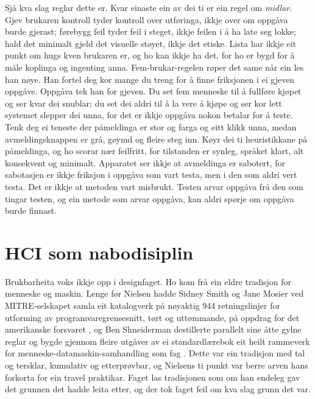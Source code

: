 Sjå kva slag reglar dette er. Kvar einaste ein av dei ti er ein regel om \emph{midlar}. Gjev brukaren kontroll tyder kontroll over utføringa, ikkje over om oppgåva burde gjerast; førebygg feil tyder feil i steget, ikkje feilen i å ha late seg lokke; hald det minimalt gjeld det visuelle støyet, ikkje det etiske. Lista har ikkje eit punkt om hugs kven brukaren er, og ho kan ikkje ha det, for ho er bygd for å måle koplinga og ingenting anna. Fem-brukar-regelen røper det same når ein les han nøye. Han fortel deg kor mange du treng for å finne friksjonen i ei gjeven oppgåve. Oppgåva tek han for gjeven. Du set fem menneske til å fullføre kjøpet og ser kvar dei snublar; du set dei aldri til å la vere å kjøpe og ser kor lett systemet slepper dei unna, for det er ikkje oppgåva nokon betalar for å teste. Tenk deg ei teneste der påmeldinga er stor og farga og eitt klikk unna, medan avmeldingsknappen er grå, gøymd og fleire steg inn. Køyr dei ti heuristikkane på påmeldinga, og ho scorar nær feilfritt, for tilstanden er synleg, språket klart, alt konsekvent og minimalt. Apparatet ser ikkje at avmeldinga er sabotert, for sabotasjen er ikkje friksjon i oppgåva som vart testa, men i den som aldri vert testa. Det er ikkje at metoden vart misbrukt. Testen arvar oppgåva frå den som tingar testen, og ein metode som arvar oppgåva, kan aldri spørje om oppgåva burde finnast.

\section{HCI som nabodisiplin}

Brukbarheita voks ikkje opp i designfaget. Ho kom frå ein eldre tradisjon for menneske og maskin. Lenge før Nielsen hadde Sidney Smith og Jane Mosier ved MITRE-selskapet samla eit katalogverk på nøyaktig 944 retningslinjer for utforming av programvaregrensesnitt, tørt og uttømmande, på oppdrag for det amerikanske forsvaret \autocite{smith1986guidelines}, og Ben Shneiderman destillerte parallelt sine åtte gylne reglar og bygde gjennom fleire utgåver av ei standardlærebok eit heilt rammeverk for menneske-datamaskin-samhandling som fag \autocite{shneiderman2016ui}. Dette var ein tradisjon med tal og tersklar, kumulativ og etterprøvbar, og Nielsens ti punkt var berre arven hans forkorta for ein travel praktikar. Faget las tradisjonen som om han endeleg gav det grunnen det hadde leita etter, og der tok faget feil om kva slag grunn det var.

